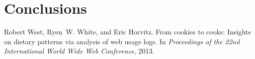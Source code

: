 \documentclass[11pt]{article}
\begin{document}
\section{Conclusions}

\begin{thebibliography}{}
	
	Robert West, Ryen~W. White, and Eric Horvitz.
	\newblock From cookies to cooks: Insights on dietary patterns via analysis of
	web usage logs.
	\newblock In {\em Proceedings of the 22nd International World Wide Web
		Conference}, 2013.
	
\end{thebibliography}
\end{document}

